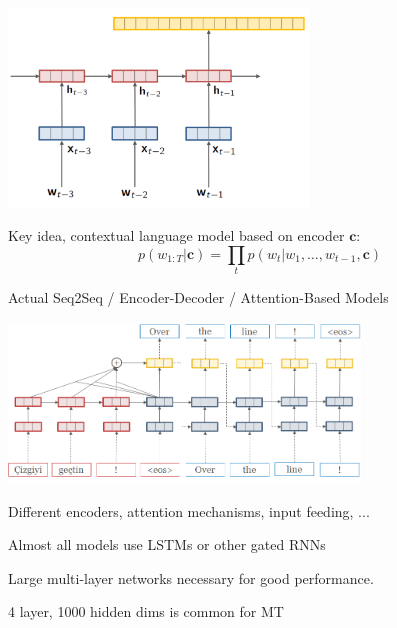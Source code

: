 \documentclass{beamer}
\let\tempone\itemize
\let\temptwo\enditemize
\renewenvironment{itemize}{\tempone\addtolength{\itemsep}{0.5\baselineskip}}{\temptwo}
\newcommand{\air}{\vspace{0.25cm}}
\newcommand{\cvec}{\mathbf{c}}
\begin{document}
\begin{frame}
  \begin{center}
  \end{center}
    \air 
   
    \begin{center}
      \includegraphics[width=0.6\textwidth]{rnnlm6}
    \end{center}
  \begin{itemize}
  \item Key idea, contextual language model based on encoder $\cvec$: 
  \end{itemize}
  \[ p(w_{1:T} | \cvec) = \prod_{t} p(w_t | w_1, \ldots, w_{t-1}, \cvec) \] 
  
\end{frame}


\begin{frame}
  \begin{center}
    Actual Seq2Seq / Encoder-Decoder / Attention-Based Models
  \end{center}
    \begin{center}
      \includegraphics[width=0.7\textwidth]{simple-attn}
    \end{center}
  \begin{itemize}
  \item Different encoders, attention mechanisms, input feeding, ...
    \air
  \item Almost all models use LSTMs or other gated RNNs 
    \air
  \item Large multi-layer networks  necessary for good performance.
    \begin{itemize}
    \item 4 layer, 1000 hidden dims is common for MT
    \end{itemize}
  \end{itemize}
\end{frame}
\end{document}
